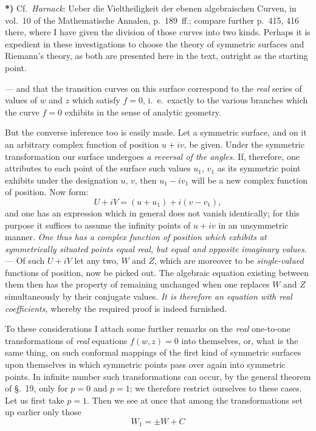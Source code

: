\documentclass{article}
\begin{document}
\textbf{*)} Cf.\ \emph{Harnack}: Ueber die Vieltheiligkeit der ebenen algebraischen Curven, in vol.~10 of the Mathematische Annalen, p.~189~ff.; compare further p.~415, 416 there, where I have given the division of those curves into two kinds. Perhaps it is expedient in these investigations to choose the theory of symmetric surfaces and Riemann's theory, as both are presented here in the text, outright as the starting point.

--- and that the transition curves on this surface correspond to the \emph{real} series of values of $w$ and $z$ which satisfy $f = 0$, i.\ e.\ exactly to the various branches which the curve $f = 0$ exhibits in the sense of analytic geometry.

But the converse inference too is easily made. Let a symmetric surface, and on it an arbitrary complex function of position $u + iv$, be given. Under the symmetric transformation our surface undergoes \emph{a reversal of the angles.} If, therefore, one attributes to each point of the surface such values $u_{1}$, $v_{1}$ as its symmetric point exhibits under the designation $u$, $v$, then $u_{1} - iv_{1}$ will be a new complex function of position. Now form:
\[ U + iV = (u + u_{1}) + i(v - v_{1}), \]
and one has an expression which in general does not vanish identically; for this purpose it suffices to assume the infinity points of $u + iv$ in an unsymmetric manner. \emph{One thus has a complex function of position which exhibits at symmetrically situated points equal real, but equal and opposite imaginary values.} --- Of such $U + iV$ let any two, $W$ and $Z$, which are moreover to be \emph{single-valued} functions of position, now be picked out. The algebraic equation existing between them then has the property of remaining unchanged when one replaces $W$ and $Z$ simultaneously by their conjugate values. \emph{It is therefore an equation with real coefficients,} whereby the required proof is indeed furnished.

To these considerations I attach some further remarks on the \emph{real} one-to-one transformations of \emph{real} equations $f(w, z) = 0$ into themselves, or, what is the same thing, on such conformal mappings of the first kind of symmetric surfaces upon themselves in which symmetric points pass over again into symmetric points. In infinite number such transformations can occur, by the general theorem of §.~19, only for $p = 0$ and $p = 1$; we therefore restrict ourselves to these cases. Let us first take $p = 1$. Then we see at once that among the transformations set up earlier only those
\[ W_{1} = \pm W + C \]
\end{document}
